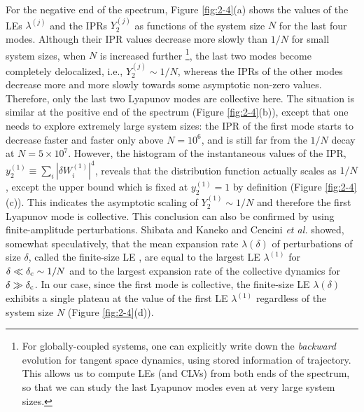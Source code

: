 \documentclass[12pt]{iopart}
\begin{document}
For the negative end of the spectrum,
 Figure \ref{fig:2-4}(a) shows the values of the LEs $\lambda^{(j)}$
 and the IPRs $Y_2^{(j)}$
 as functions of the system size $N$ for the last four modes.
Although their IPR values decrease more slowly than $1/N$
 for small system sizes, when $N$ is increased further%
\footnote{
For globally-coupled systems, one can explicitly write down
 the \textit{backward} evolution for tangent space dynamics,
 using stored information of trajectory.
This allows us to compute LEs (and CLVs) from both ends of the spectrum,
 so that we can study the last Lyapunov modes
 even at very large system sizes.},
 the last two modes become completely delocalized, i.e., $Y_2^{(j)} \sim 1/N$,
 whereas the IPRs of the other modes decrease more and more slowly
 towards some asymptotic non-zero values.
Therefore, only the last two Lyapunov modes are collective here.
The situation is similar at the positive end of the spectrum
 (Figure \ref{fig:2-4}(b)),
 except that one needs to explore extremely large system sizes:
 the IPR of the first mode starts to decrease faster and faster
 only above $N=10^6$, and is still far from the $1/N$ decay
 at $N = 5 \times 10^7$.
However, the histogram of the instantaneous values of the IPR,
 $y_2^{(1)} \equiv \sum_i |\delta W_i^{(1)}|^4$,
 reveals that the distribution function actually scales as $1/N$,
 except the upper bound which is fixed at $y_2^{(1)} = 1$ by definition
 (Figure \ref{fig:2-4}(c)).
This indicates the asymptotic scaling of $Y_2^{(1)} \sim 1/N$
 and therefore the first Lyapunov mode is collective.
This conclusion can also be confirmed by using finite-amplitude perturbations.
Shibata and Kaneko \cite{Shibata.Kaneko-PRL1998}
 and Cencini \textit{et al.} \cite{Cencini.etal-PD1999}
 showed, somewhat speculatively, that the mean expansion rate $\lambda(\delta)$
 of perturbations of size $\delta$,
 called the finite-size LE \cite{Cencini.Vulpiani-JPA2012},
 are equal to the largest LE $\lambda^{(1)}$
 for $\delta \ll \delta_{\rm c} \sim 1/N$
 and to the largest expansion rate of the collective dynamics
 for $\delta \gg \delta_{\rm c}$.
In our case, since the first mode is collective,
 the finite-size LE $\lambda(\delta)$ exhibits a single plateau
 at the value of the first LE $\lambda^{(1)}$
 regardless of the system size $N$ (Figure \ref{fig:2-4}(d)).
\end{document}
